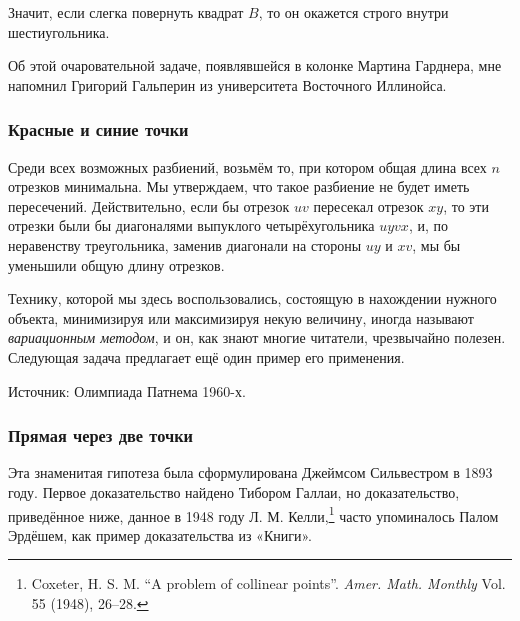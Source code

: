 Значит, если слегка повернуть квадрат $B$, то он окажется строго внутри шестиугольника.\heart

Об этой очаровательной задаче, появлявшейся в колонке Мартина Гарднера, мне напомнил Григорий Гальперин из университета Восточного Иллинойса.

\subsubsection*{Красные и синие точки}%

Среди всех возможных разбиений, возьмём то, при котором общая длина всех $n$ отрезков минимальна.
Мы утверждаем, что такое разбиение не будет иметь пересечений.
Действительно, если бы отрезок $uv$ пересекал отрезок $xy$, то эти отрезки были бы диагоналями выпуклого четырёхугольника $uyvx$, %
и, по неравенству треугольника, заменив диагонали на стороны $uy$ и $xv$, мы бы уменьшили общую длину отрезков.\heart

Технику, которой мы здесь воспользовались, состоящую в нахождении нужного объекта, минимизируя или максимизируя некую величину, иногда называют \emph{вариационным методом}, и он, как знают многие читатели, чрезвычайно полезен.
Следующая задача предлагает ещё один пример его применения.

Источник: Олимпиада Патнема 1960-х.

\subsubsection*{Прямая через две точки}%

Эта знаменитая гипотеза была сформулирована Джеймсом Сильвестром в 1893 году.
Первое доказательство найдено Тибором Галлаи, %
но доказательство, приведённое ниже, данное в 1948 году Л. М. Келли,\footnote{
Coxeter, H. S. M. ``A problem of collinear points''. \emph{Amer. Math. Monthly} Vol. 55 (1948), 26--28.
} 
часто упоминалось Палом Эрдёшем, как пример доказательства из «Книги».

\medskip

